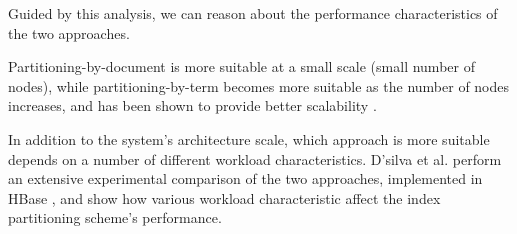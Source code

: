 
Guided by this analysis, we can reason about the performance characteristics of the two approaches.

Partitioning-by-document is more suitable at a small scale (small number of nodes),
while partitioning-by-term becomes more suitable as the number of nodes increases,
and has been shown to provide better scalability \cite{kejriwal:slik}.

In addition to the system's architecture scale,
which approach is more suitable depends on a number of different workload characteristics.
D'silva et al. \cite{dsilva:tworings} perform an extensive experimental comparison of the two approaches,
implemented in HBase \cite{hbase:doc}, and show how various workload characteristic affect the index partitioning scheme's performance.





